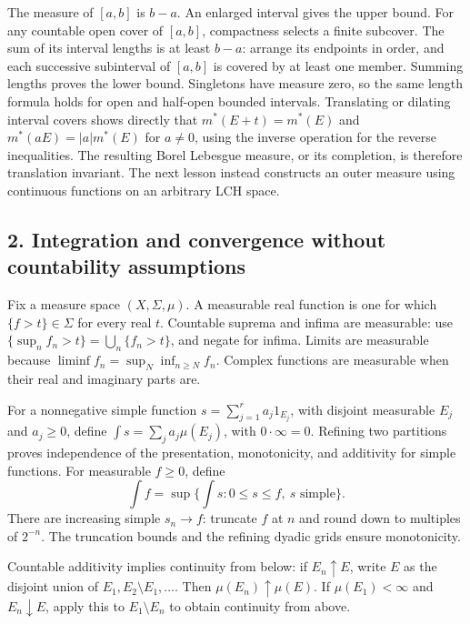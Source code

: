 \documentclass[
  english,
  11pt,
  a4paper,
]{article}
\begin{document}
The measure of \([a,b]\) is \(b-a\). An enlarged interval gives the
upper bound. For any countable open cover of \([a,b]\), compactness
selects a finite subcover. The sum of its interval lengths is at least
\(b-a\): arrange its endpoints in order, and each successive subinterval
of \([a,b]\) is covered by at least one member. Summing lengths proves
the lower bound. Singletons have measure zero, so the same length
formula holds for open and half-open bounded intervals. Translating or
dilating interval covers shows directly that \(m^*(E+t)=m^*(E)\) and
\(m^*(aE)=|a|m^*(E)\) for \(a\ne0\), using the inverse operation for the
reverse inequalities. The resulting Borel Lebesgue measure, or its
completion, is therefore translation invariant. The next lesson instead
constructs an outer measure using continuous functions on an arbitrary
LCH space.

\subsection{2. Integration and convergence without countability
assumptions}\label{measure-and-hilbert-space-tools--2-integration-and-convergence-without-countability-assumptions}

Fix a measure space \((X,\Sigma,\mu)\). A measurable real function is
one for which \(\{f>t\}\in\Sigma\) for every real \(t\). Countable
suprema and infima are measurable: use
\(\{\sup_n f_n>t\}=\bigcup_n\{f_n>t\}\), and negate for infima. Limits
are measurable because \(\liminf f_n=\sup_N\inf_{n\geq N}f_n\). Complex
functions are measurable when their real and imaginary parts are.

For a nonnegative simple function \(s=\sum_{j=1}^r a_j1_{E_j}\), with
disjoint measurable \(E_j\) and \(a_j\geq0\), define
\(\int s=\sum_j a_j\mu(E_j)\), with \(0\cdot\infty=0\). Refining two
partitions proves independence of the presentation, monotonicity, and
additivity for simple functions. For measurable \(f\geq0\), define
\[\int f=\sup\{\int s:0\leq s\leq f,\ s\text{ simple}\}.\] There are
increasing simple \(s_n\to f\): truncate \(f\) at \(n\) and round down
to multiples of \(2^{-n}\). The truncation bounds and the refining
dyadic grids ensure monotonicity.

Countable additivity implies continuity from below: if
\(E_n\uparrow E\), write \(E\) as the disjoint union of
\(E_1,E_2\setminus E_1,\ldots\). Then \(\mu(E_n)\uparrow\mu(E)\). If
\(\mu(E_1)<\infty\) and \(E_n\downarrow E\), apply this to
\(E_1\setminus E_n\) to obtain continuity from above.
\end{document}
